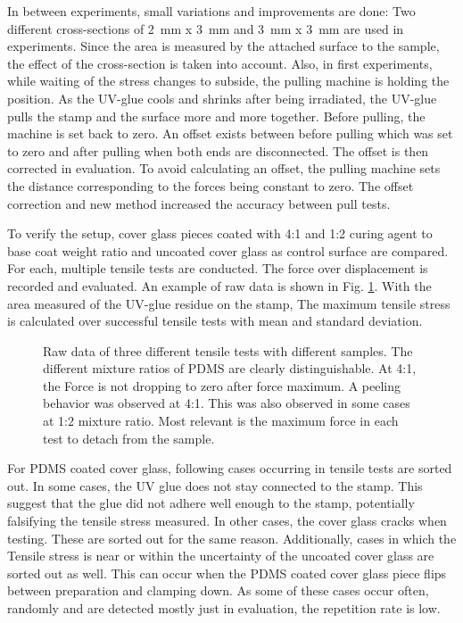 In between experiments, small variations and improvements are done: Two different cross-sections of \SI{2}{\milli\meter} x \SI{3}{\milli\meter} and \SI{3}{\milli\meter} x \SI{3}{\milli\meter} are used in experiments. Since the area is measured by the attached surface to the sample, the effect of the cross-section is taken into account. Also, in first experiments, while waiting of the stress changes to subside, the pulling machine is holding the position. As the UV-glue cools and shrinks after being irradiated, the UV-glue pulls the stamp and the surface more and more together. Before pulling, the machine is set back to zero. An offset exists between before pulling which was set to zero and after pulling when both ends are disconnected. The offset is then corrected in evaluation. To avoid calculating an offset, the pulling machine sets the distance corresponding to the forces being constant to zero. The offset correction and new method increased the accuracy between pull tests.

To verify the setup, cover glass pieces coated with 4:1 and 1:2 curing agent to base coat weight ratio and uncoated cover glass as control surface are compared. For each, multiple tensile tests are conducted. The force over displacement is recorded and evaluated. An example of raw data is shown in Fig. \ref{fig:forceOverTime}. With the area measured of the UV-glue residue on the stamp, The maximum tensile stress is calculated over successful tensile tests with mean and standard deviation.  

\begin{figure}[hbt!]
	\centering
	
	\caption{Raw data of three different tensile tests with different samples. The different mixture ratios of PDMS are clearly distinguishable. At 4:1, the Force is not dropping to zero after force maximum. A peeling behavior was observed at 4:1. This was also observed in some cases at 1:2 mixture ratio. Most relevant is the maximum force in each test to detach from the sample.}
	\label{fig:forceOverTime}
\end{figure}

For PDMS coated cover glass, following cases occurring in tensile tests are sorted out. In some cases, the UV glue does not stay connected to the stamp. This suggest that the glue did not adhere well enough to the stamp, potentially falsifying the tensile stress measured. In other cases, the cover glass cracks when testing. These are sorted out for the same reason. Additionally, cases in which the Tensile stress is near or within the uncertainty of the uncoated cover glass are sorted out as well. This can occur when the PDMS coated cover glass piece flips between preparation and clamping down. As some of these cases occur often, randomly and are detected mostly just in evaluation, the repetition rate is low.

